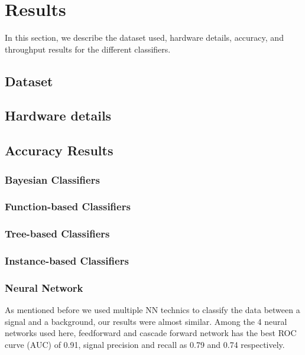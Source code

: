 \section{Results}
\label{sec:results}

In this section, we describe the dataset used, hardware details, accuracy, and throughput results for the different classifiers.

\subsection{Dataset}

\subsection{Hardware details}

\subsection{Accuracy Results}

\subsubsection{Bayesian Classifiers}

\subsubsection{Function-based Classifiers}


\subsubsection{Tree-based Classifiers}

\subsubsection{Instance-based Classifiers}

\subsubsection{Neural Network}
As mentioned before we used multiple NN technics to classify the data between a signal and a background, our results were almost similar. Among the 4 neural networks used here, feedforward and cascade forward network has the best ROC curve (AUC) of 0.91, signal precision and recall as 0.79 and 0.74 respectively.  

